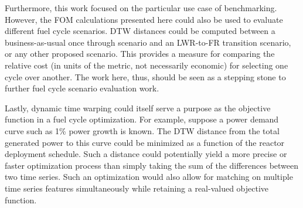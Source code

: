 Furthermore, this work focused on the particular use case of benchmarking.
However, the FOM calculations presented here could also be used to evaluate 
different fuel cycle scenarios. DTW distances could be computed between
a business-as-usual once through scenario and an LWR-to-FR transition
scenario, or any other proposed scenario. This provides a measure for 
comparing the relative cost (in units of the metric, not necessarily 
economic) for selecting one cycle over another. The work here, thus, 
should be seen as a stepping stone to further fuel cycle scenario evaluation
work.

Lastly, dynamic time warping could itself serve a purpose as the objective 
function in a fuel cycle optimization.  For example, suppose a power demand curve 
such as 1\% power growth is known. The DTW distance from the total generated
power to this curve could be minimized as a function of the reactor 
deployment schedule. Such a distance could potentially yield a more 
precise or faster optimization process than simply taking the sum of 
the differences between two time series. Such an optimization would also allow
for matching on multiple time series features simultaneously while retaining
a real-valued objective function.

